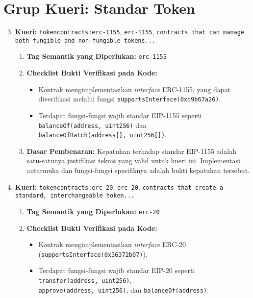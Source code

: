\section{Grup Kueri: Standar Token}
\begin{enumerate}
    \setcounter{enumi}{2}
    \item \textbf{Kueri:} \texttt{token\textunderscore contracts:erc-1155}, \texttt{erc-1155}, \texttt{contracts that can manage both fungible and non-fungible tokens...}
    \begin{enumerate}
        \item \textbf{Tag Semantik yang Diperlukan:} \texttt{erc-1155}
        \item \textbf{Checklist Bukti Verifikasi pada Kode:}
        \begin{itemize}
            \item Kontrak mengimplementasikan \textit{interface} ERC-1155, yang dapat diverifikasi melalui fungsi \texttt{supportsInterface(0xd9b67a26)}.
            \item Terdapat fungsi-fungsi wajib standar EIP-1155 seperti \\\texttt{balanceOf(address, uint256)} dan \\\texttt{balanceOfBatch(address[], uint256[])}.
        \end{itemize}
        \item \textbf{Dasar Pembenaran:} Kepatuhan terhadap standar EIP-1155 adalah satu-satunya justifikasi teknis yang valid untuk kueri ini. Implementasi antarmuka dan fungsi-fungsi spesifiknya adalah bukti kepatuhan tersebut.
    \end{enumerate}
    \item \textbf{Kueri:} \texttt{token\textunderscore contracts:erc-20}, \texttt{erc-20}, \texttt{contracts that create a standard, interchangeable token...}
    \begin{enumerate}
        \item \textbf{Tag Semantik yang Diperlukan:} \texttt{erc-20}
        \item \textbf{Checklist Bukti Verifikasi pada Kode:}
        \begin{itemize}
            \item Kontrak mengimplementasikan \textit{interface} ERC-20 \\(\texttt{supportsInterface(0x36372b07)}).
            \item Terdapat fungsi-fungsi wajib standar EIP-20 seperti \\\texttt{transfer(address, uint256)}, \\\texttt{approve(address, uint256)}, dan \texttt{balanceOf(address)}.

\end{itemize}
\end{enumerate}
\end{enumerate}
